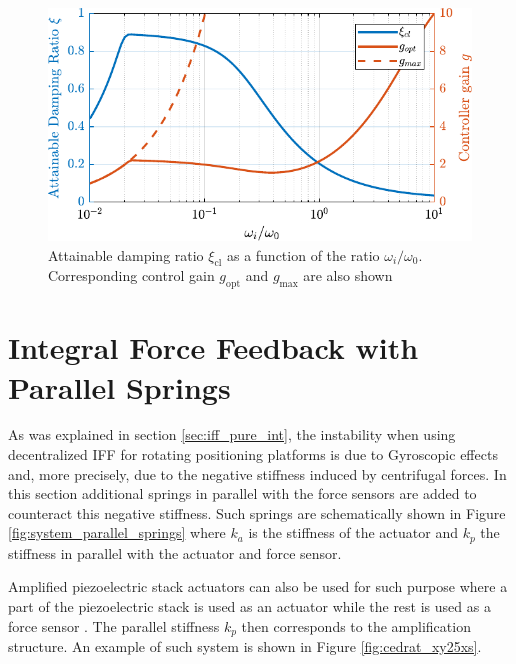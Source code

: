 \documentclass{ISMA_USD2020}
\begin{document}
\begin{figure}[htbp]
\centering
\includegraphics[scale=1]{figs/mod_iff_damping_wi.pdf}
\caption{\label{fig:mod_iff_damping_wi}Attainable damping ratio \(\xi_\text{cl}\) as a function of the ratio \(\omega_i/\omega_0\). Corresponding control gain \(g_\text{opt}\) and \(g_\text{max}\) are also shown}
\end{figure}

\section{Integral Force Feedback with Parallel Springs}
\label{sec:orge64ac7f}
\label{sec:iff_kp}
As was explained in section \ref{sec:iff_pure_int}, the instability when using decentralized IFF for rotating positioning platforms is due to Gyroscopic effects and, more precisely, due to the negative stiffness induced by centrifugal forces.
In this section additional springs in parallel with the force sensors are added to counteract this negative stiffness.
Such springs are schematically shown in Figure \ref{fig:system_parallel_springs} where \(k_a\) is the stiffness of the actuator and \(k_p\) the stiffness in parallel with the actuator and force sensor.

Amplified piezoelectric stack actuators can also be used for such purpose where a part of the piezoelectric stack is used as an actuator while the rest is used as a force sensor \cite{souleille18_concep_activ_mount_space_applic}.
The parallel stiffness \(k_p\) then corresponds to the amplification structure.
An example of such system is shown in Figure \ref{fig:cedrat_xy25xs}.
\end{document}
